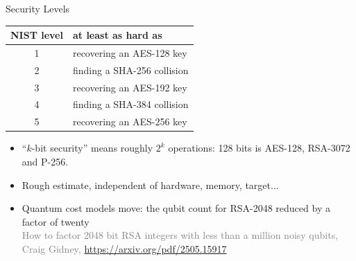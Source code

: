 \documentclass[aspectratio=169]{beamer}
\newcommand{\cgrey}[1]{\textcolor{grey}{#1}}
\begin{document}
\begin{frame}{Security Levels}
  \centering\footnotesize
  \begin{tabular}{c l}
    \toprule
    \textbf{NIST level}  & \textbf{at least as hard as}  \\
    \midrule
    1 & recovering an AES-128 key  \\
    2 & finding a SHA-256 collision  \\
    3 & recovering an AES-192 key  \\
    4 & finding a SHA-384 collision  \\
    5 & recovering an AES-256 key  \\
    \bottomrule
  \end{tabular}
  \vspace{2mm}
  \begin{itemize}
    \item<2-> ``$k$-bit security'' means roughly $2^{k}$ operations: 
      128 bits is AES-128,
      RSA-3072 and P-256.
    \item<3-> Rough estimate, independent of hardware, memory, target... 
    \item<4-> \alert{Quantum cost models move:} the qubit count for RSA-2048 reduced by a factor of
      twenty \\ \pause
      \cgrey{How to factor 2048 bit RSA integers with less than a million noisy qubits, Craig Gidney, \url{https://arxiv.org/pdf/2505.15917}}
  \end{itemize}
\end{frame}
\end{document}
